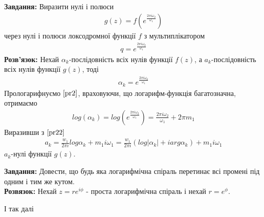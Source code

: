 \documentclass[12pt,a4paper]{article}
\begin{document}
\begin{pryk}
\textbf{Завдання:} Виразити нулі і полюси
\[\begin{array}{l}
g(z)=f(e^{\frac{2\pi i \omega_{2} }{\omega_{1}}})
\end{array}\]
через нулі і полюси локсодромної функції $f$ з мультиплікатором 
\[\begin{array}{l}
q=e^{\frac{2\pi i \omega_{2} }{\omega_{1}}}
\end{array}\]
\textbf{Розв'язок:} Нехай $\alpha_{k} $-послідовність всіх нулів функції $f(z)$, а $a_{k}$-послідовність всіх нулів функції $g(z)$, тоді
\begin{equation}\label{pr2}
\begin{array}{l}
\alpha_{k}=e^{\frac{2\pi i \omega_{2} }{\omega_{1}}}
\end{array}
\end{equation}
Прологарифнуємо $\eqref{pr2}$, враховуючи, що логарифм-функція багатозначна, отримаємо
\begin{equation}\label{pr22}
\begin{array}{l}
log(\alpha_{k})=log(e^{\frac{2\pi i \omega_{2} }{\omega_{1}}})= \frac{2\pi i \omega_{2} }{\omega_{1}}+ 2\pi m_{1} 
\end{array}
\end{equation}
Виразивши з $\eqref{pr22}$ 
\[\begin{array}{l}
a_{k}=\frac{w_{1}}{2\pi i}log\alpha_{k} + m_{1}i\omega_{1}=\frac{w_{1}}{2\pi i}(log\vert\alpha_{k}\vert + iarg\alpha_{k})+m_{1}i\omega_{1}
\end{array}\]
$a_{k}$-нулі функції $g(z)$.
\end{pryk}
\vspace{1,5cm}

\begin{pryk}
\textbf{Завдання:} Довести, що будь яка логарифмічна спіраль перетинає всі промені під одним і тим же кутом.\\

\textbf{Розвязок:} Нехай $z=re^{i\phi}$ - проста логарифмічна спіраль і нехай $r=e^{\phi}$. 
\end{pryk}
\vspace{1,5cm}


І так далі\cite{web}


\clearpage
\end{document}
